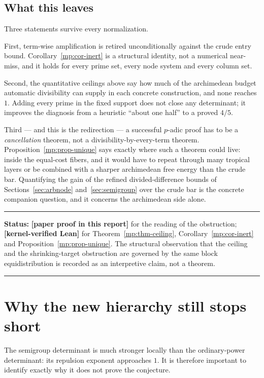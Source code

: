 \documentclass[11pt,oneside]{article}
\theoremstyle{definition}
\theoremstyle{remark}
\newcommand{\statuslean}{\textcolor{leanblue}{\textbf{[kernel-verified Lean]}}}
\newcommand{\statusnew}{\textcolor{newgreen}{\textbf{[paper proof in this report]}}}
\newenvironment{statusbox}[1]
{\begin{center}\begin{minipage}{0.94\textwidth}\raggedright\hbadness=10000\hrule
\vspace{0.45em}\textbf{Status:} #1\par\vspace{0.35em}}
{\vspace{0.35em}\hrule\end{minipage}\end{center}}
\begin{document}
\subsection{What this leaves}

Three statements survive every normalization.

First, term-wise amplification is retired unconditionally against the crude entry bound.
Corollary~\ref{mp:cor-inert} is a structural identity, not a numerical near-miss, and it holds
for every prime set, every node system and every column set.

Second, the quantitative ceilings above say how much of the archimedean budget automatic
divisibility can supply in each concrete construction, and none reaches $1$.  Adding every
prime in the fixed support does not close any determinant; it improves the diagnosis from a
heuristic ``about one half'' to a proved $4/5$.

Third --- and this is the redirection --- a successful $p$-adic proof has to be a
\emph{cancellation} theorem, not a divisibility-by-every-term theorem.
Proposition~\ref{mp:prop-unique} says exactly where such a theorem could live: inside the
equal-cost fibers, and it would have to repeat through many tropical layers or be combined with
a sharper archimedean free energy than the crude bar.  Quantifying the gain of the refined
divided-difference bounds of Sections~\ref{sec:arbnode} and~\ref{sec:semigroup} over the crude
bar is the concrete companion question, and it concerns the archimedean side alone.

\begin{statusbox}{\statusnew{} for the reading of the obstruction; \statuslean{} for
Theorem~\ref{mp:thm-ceiling}, Corollary~\ref{mp:cor-inert} and
Proposition~\ref{mp:prop-unique}.  The structural observation that the ceiling and the
shrinking-target obstruction are governed by the same block equidistribution is recorded as an
interpretive claim, not a theorem.}
\end{statusbox}

\section{Why the new hierarchy still stops short}
\label{sec:deficit}

The semigroup determinant is much stronger locally than the ordinary-power determinant: its
repulsion exponent approaches $1$.  It is therefore important to identify exactly why it does
not prove the conjecture.
\end{document}
